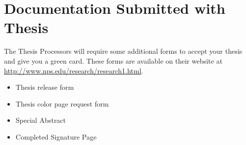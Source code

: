 \section{Documentation Submitted with Thesis}
The Thesis Processors will require some additional forms to accept
your thesis and give you a green card.  These forms are available on
their website at \url{http://www.nps.edu/research/research1.html}.

\begin{itemize}
  \item Thesis release form
  \item Thesis color page request form
  \item Special Abstract
  \item Completed Signature Page
\end{itemize}
